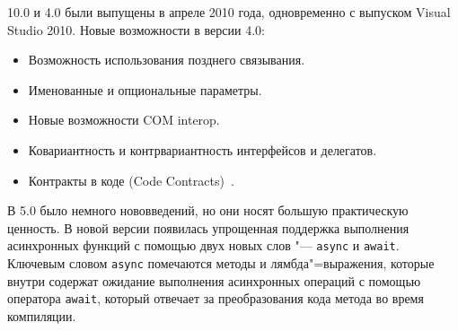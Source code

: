 \vbnet{} 10.0 и \csharp{} 4.0 были выпущены в апреле 2010 года, одновременно с выпуском Visual Studio 2010.
Новые возможности в версии 4.0:
\begin{itemize}
  \item Возможность использования позднего связывания.
  \item Именованные и опциональные параметры.
  \item Новые возможности COM interop.
  \item Ковариантность и контрвариантность интерфейсов и делегатов.
  \item Контракты в коде (Code Contracts)~\cite{csharp_wiki_2013_ru}.
\end{itemize}

В \csharp{} 5.0 было немного нововведений, но они носят большую практическую ценность.
В новой версии появилась упрощенная поддержка выполнения асинхронных функций с помощью двух новых слов "---  \lstinline[style=csharpinlinestyle]!async! и \lstinline[style=csharpinlinestyle]!await!.
Ключевым словом \lstinline[style=csharpinlinestyle]!async! помечаются методы и лямбда"=выражения, которые внутри содержат ожидание выполнения асинхронных операций с помощью оператора \lstinline[style=csharpinlinestyle]!await!, который отвечает за преобразования кода метода во время компиляции.

